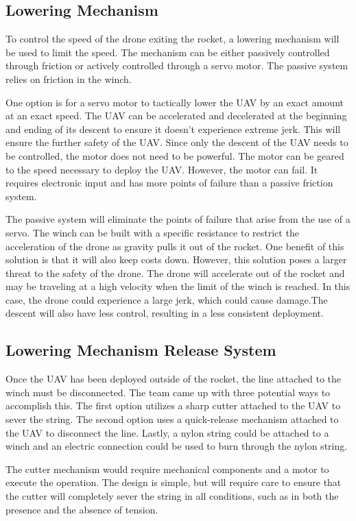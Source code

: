 	\subsection{Lowering Mechanism}
		To control the speed of the drone exiting the rocket, a lowering mechanism will be used to limit the speed. The mechanism can be either passively controlled through friction or actively controlled through a servo motor. The passive system relies on friction in the winch. 

		One option is for a servo motor to tactically lower the UAV by an exact amount at an exact speed. The UAV can be accelerated and decelerated at the beginning and ending of its descent to ensure it doesn't experience extreme jerk. This will ensure the further safety of the UAV. Since only the descent of the UAV needs to be controlled, the motor does not need to be powerful. The motor can be geared to the speed necessary to deploy the UAV. However, the motor can fail. It requires electronic input and has more points of failure than a passive friction system.
	
		The passive system will eliminate the points of failure that arise from the use of a servo. The winch can be built with a specific resistance to restrict the acceleration of the drone as gravity pulls it out of the rocket. One benefit of this solution is that it will also keep costs down. However, this solution poses a larger threat to the safety of the drone. The drone will accelerate out of the rocket and may be traveling at a high velocity when the limit of the winch is reached. In this case, the drone could experience a large jerk, which could cause damage.The descent will also have less control, resulting in a less consistent deployment.
	
	\subsection{Lowering Mechanism Release System}
		Once the UAV has been deployed outside of the rocket, the line attached to the winch must be disconnected. The team came up with three potential ways to accomplish this. The first option utilizes a sharp cutter attached to the UAV to sever the string. The second option uses a quick-release mechanism attached to the UAV to disconnect the line. Lastly, a nylon string could be attached to a winch and an electric connection could be used to burn through the nylon string. 

		The cutter mechanism would require mechanical components and a motor to execute the operation. The design is simple, but will require care to ensure that the cutter will completely sever the string in all conditions, such as in both the presence and the absence of tension. 
	
